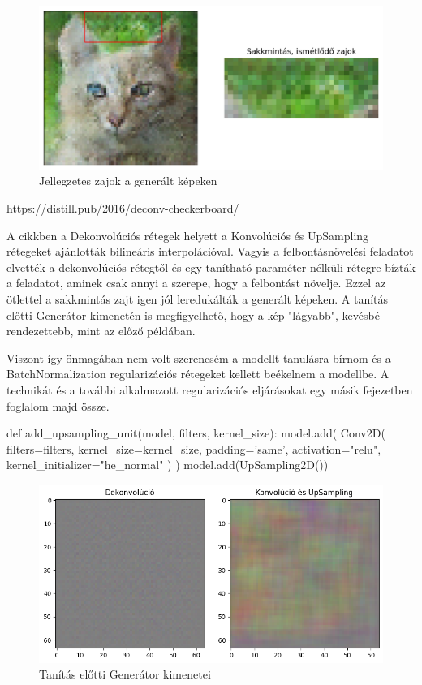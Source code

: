 
\begin{figure}[h]
\centering
\includegraphics[width=13cm]{images/chessboard-patterns.png}
\caption{Jellegzetes zajok a generált képeken}
\label{fig:chessboard-patterns}
\end{figure}

https://distill.pub/2016/deconv-checkerboard/

A cikkben a Dekonvolúciós rétegek helyett a Konvolúciós és UpSampling rétegeket ajánlották bilineáris interpolációval. Vagyis a felbontásnövelési feladatot elvették a dekonvolúciós rétegtől és egy tanítható-paraméter nélküli rétegre bízták a feladatot, aminek csak annyi a szerepe, hogy a felbontást növelje. Ezzel az ötlettel a sakkmintás zajt igen jól leredukálták a generált képeken. A tanítás előtti Generátor kimenetén is megfigyelhető, hogy a kép "lágyabb", kevésbé rendezettebb, mint az előző példában.

Viszont így önmagában nem volt szerencsém a modellt tanulásra bírnom és a BatchNormalization regularizációs rétegeket kellett beékelnem a modellbe. A technikát és a további alkalmazott regularizációs eljárásokat egy másik fejezetben foglalom majd össze.

\begin{python}
def add_upsampling_unit(model,
                        filters, kernel_size):
    model.add(
        Conv2D(
            filters=filters,
            kernel_size=kernel_size,
            padding='same',
            activation="relu",
            kernel_initializer="he_normal"
        )
    )
    model.add(UpSampling2D())
\end{python}

\begin{figure}[h]
\centering
\includegraphics[width=13cm]{images/deconv-vs-conv_upsmpl.png}
\caption{Tanítás előtti Generátor kimenetei}
\label{fig:deconv-vs-conv_upsmpl}
\end{figure}